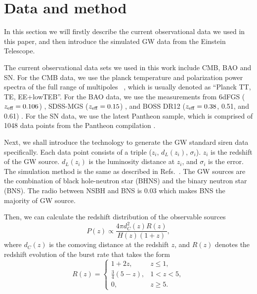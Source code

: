 \documentclass[aps,prd,nofootinbib,amsmath,amssymb,superscriptaddress,twocolumn,10pt]{revtex4}%
\begin{document}
\section{Data and method}\label{sec3}

In this section we will firstly describe the current observational data we used in this paper, and then introduce the simulated GW data from the Einstein Telescope.

The current observational data sets we used in this work include CMB, BAO and SN. For the CMB data, we use the planck temperature and polarization power spectra of the full range of multipoles ~\cite{Aghanim:2015xee}, which is usually denoted as ``Planck TT, TE, EE+lowTEB''. For the BAO data, we use the measurements from 6dFGS ($z_{\rm eff}=0.106$) \cite{Beutler:2011hx}, SDSS-MGS ($z_{\rm eff}=0.15$) \cite{Ross:2014qpa}, and BOSS DR12 ($z_{\rm eff}=0.38$, 0.51, and 0.61) \cite{Alam:2016hwk}. For the SN data, we use the latest Pantheon sample, which is comprised of 1048 data points from the Pantheon compilation \cite{Scolnic:2017caz}.


Next, we shall introduce the technology to generate the GW standard siren data specifically. Each data point  consists of a triple ($z_{i}$, $d_{L}(z_{i})$, $\sigma_{i}$). $z_{i}$ is the redshift of the GW source. $d_{L}(z_{i})$ is the luminosity distance at $z_{i}$, and $\sigma_{i}$ is the error. The simulation method is the same as described in Refs.~\cite{Cai:2016sby,Zhao:2010sz,Wang:2018lun,Zhang:2018byx}. The GW sources are the combination of black hole-neutron star (BHNS) and the binary neutron star (BNS). The radio between NSBH and BNS is 0.03 which makes BNS the majority of GW source.

Then, we can calculate the redshift distribution of the observable sources \cite{Cai:2016sby,Zhao:2010sz}
\begin{equation}
P(z)\propto \frac{4\pi d_C^2(z)R(z)}{H(z)(1+z)},
\label{equa:pz}
\end{equation}
where $d_C(z)$ is the comoving distance at the redshift $z$, and $R(z)$ denotes the redshift evolution of the burst rate that takes the form  \cite{Schneider:2000sg,Cutler:2009qv,Cai:2016sby}
\begin{equation}
R(z)=\begin{cases}
1+2z, & z\leq 1, \\
\frac{3}{4}(5-z), & 1<z<5, \\
0, & z\geq 5.
\end{cases}
\label{equa:rz}
\end{equation}
\end{document}
